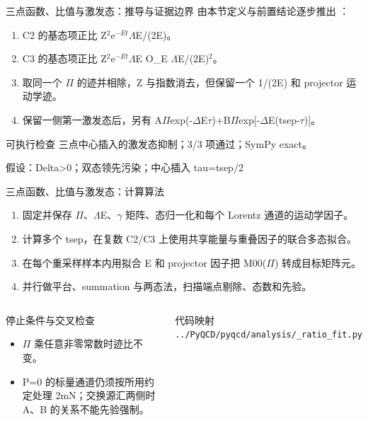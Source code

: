 \begin{frame}[t]{三点函数、比值与激发态：推导与证据边界}
\footnotesize
{}\quad 由本节定义与前置结论逐步推出 ：
\begin{enumerate}
\item C2 的基态项正比 Z\ensuremath{^{2}}e\ensuremath{^{-Et}}\ensuremath{\Lambda}E/\allowbreak{}(2E)。
\item C3 的基态项正比 Z\ensuremath{^{2}}e\ensuremath{^{-Et}}\ensuremath{\Lambda}E O\_E \ensuremath{\Lambda}E/\allowbreak{}(2E)\ensuremath{^{2}}。
\item 取同一个 \ensuremath{\Pi} 的迹并相除，Z 与指数消去，但保留一个 1/\allowbreak{}(2E) 和 projector 运动学迹。
\item 保留一侧第一激发态后，另有 A\ensuremath{\Pi}exp(-\ensuremath{\Delta}E\ensuremath{\tau})+B\ensuremath{\Pi}exp[-\ensuremath{\Delta}E(tsep-\ensuremath{\tau})]。
\end{enumerate}\begin{block}{可执行检查}
\quad 三点中心插入的激发态抑制；3/3 项通过；SymPy exact。
\par\scriptsize 假设：Delta>0；双态领先污染；中心插入 tau=tsep/\allowbreak{}2
\end{block}
\end{frame}

\begin{frame}[t]{三点函数、比值与激发态：计算算法}
\footnotesize
{}\begin{enumerate}
\item 固定并保存 \ensuremath{\Pi}、\ensuremath{\Lambda}E、\ensuremath{\gamma} 矩阵、态归一化和每个 Lorentz 通道的运动学因子。
\item 计算多个 tsep，在复数 C2/\allowbreak{}C3 上使用共享能量与重叠因子的联合多态拟合。
\item 在每个重采样样本内用拟合 E 和 projector 因子把 M00(\ensuremath{\Pi}) 转成目标矩阵元。
\item 并行做平台、summation 与两态法，扫描端点剔除、态数和先验。
\end{enumerate}\begin{columns}[T,onlytextwidth]
\begin{block}{停止条件与交叉检查}\scriptsize\begin{itemize}
\item[\CheckMark] \ensuremath{\Pi} 乘任意非零常数时迹比不变。
\item[\CheckMark] P=0 的标量通道仍须按所用约定处理 2mN；交换源汇两侧时 A、B 的关系不能先验强制。
\end{itemize}\end{block}
\begin{block}{代码映射}
\scriptsize \texttt{.\allowbreak{}.\allowbreak{}/\allowbreak{}PyQCD/\allowbreak{}pyqcd/\allowbreak{}analysis/\allowbreak{}\_\allowbreak{}ratio\_\allowbreak{}fit.\allowbreak{}py}
\end{block}\end{columns}\end{frame}

